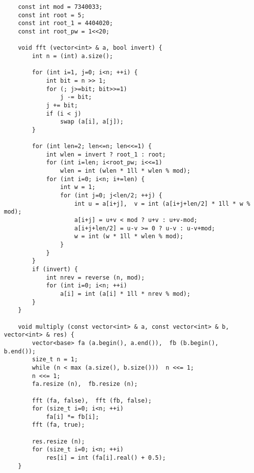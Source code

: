 \documentclass{article}
\begin{document}
\begin{verbatim}
    const int mod = 7340033;
    const int root = 5;
    const int root_1 = 4404020;
    const int root_pw = 1<<20;
     
    void fft (vector<int> & a, bool invert) {
        int n = (int) a.size();
     
        for (int i=1, j=0; i<n; ++i) {
            int bit = n >> 1;
            for (; j>=bit; bit>>=1)
                j -= bit;
            j += bit;
            if (i < j)
                swap (a[i], a[j]);
        }
     
        for (int len=2; len<=n; len<<=1) {
            int wlen = invert ? root_1 : root;
            for (int i=len; i<root_pw; i<<=1)
                wlen = int (wlen * 1ll * wlen % mod);
            for (int i=0; i<n; i+=len) {
                int w = 1;
                for (int j=0; j<len/2; ++j) {
                    int u = a[i+j],  v = int (a[i+j+len/2] * 1ll * w % mod);
                    a[i+j] = u+v < mod ? u+v : u+v-mod;
                    a[i+j+len/2] = u-v >= 0 ? u-v : u-v+mod;
                    w = int (w * 1ll * wlen % mod);
                }
            }
        }
        if (invert) {
            int nrev = reverse (n, mod);
            for (int i=0; i<n; ++i)
                a[i] = int (a[i] * 1ll * nrev % mod);
        }
    }

    void multiply (const vector<int> & a, const vector<int> & b, vector<int> & res) {
        vector<base> fa (a.begin(), a.end()),  fb (b.begin(), b.end());
        size_t n = 1;
        while (n < max (a.size(), b.size()))  n <<= 1;
        n <<= 1;
        fa.resize (n),  fb.resize (n);
     
        fft (fa, false),  fft (fb, false);
        for (size_t i=0; i<n; ++i)
            fa[i] *= fb[i];
        fft (fa, true);
     
        res.resize (n);
        for (size_t i=0; i<n; ++i)
            res[i] = int (fa[i].real() + 0.5);
    }
\end{verbatim}
\end{document}
